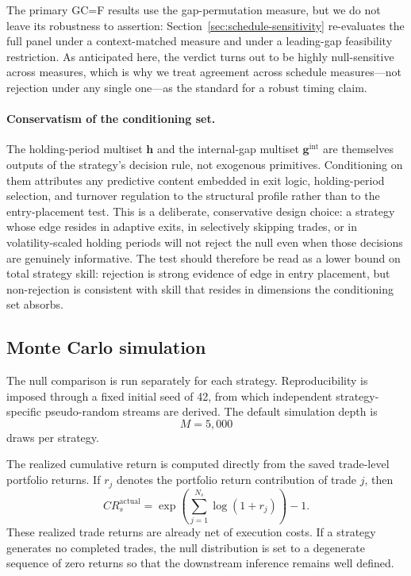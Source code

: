 \documentclass[preprint,12pt]{elsarticle}
\theoremstyle{definition}
\begin{document}
The primary GC=F results use the gap-permutation measure, but we do not leave its robustness to assertion: Section~\ref{sec:schedule-sensitivity} re-evaluates the full panel under a context-matched measure and under a leading-gap feasibility restriction. As anticipated here, the verdict turns out to be highly null-sensitive across measures, which is why we treat agreement across schedule measures---not rejection under any single one---as the standard for a robust timing claim.

\paragraph{Conservatism of the conditioning set.} The holding-period multiset $\mathbf{h}$ and the internal-gap multiset $\mathbf{g}^{\mathrm{int}}$ are themselves outputs of the strategy's decision rule, not exogenous primitives. Conditioning on them attributes any predictive content embedded in exit logic, holding-period selection, and turnover regulation to the structural profile rather than to the entry-placement test. This is a deliberate, conservative design choice: a strategy whose edge resides in adaptive exits, in selectively skipping trades, or in volatility-scaled holding periods will not reject the null even when those decisions are genuinely informative. The test should therefore be read as a lower bound on total strategy skill: rejection is strong evidence of edge in entry placement, but non-rejection is consistent with skill that resides in dimensions the conditioning set absorbs.

\subsection{Monte Carlo simulation}

The null comparison is run separately for each strategy. Reproducibility is imposed through a fixed initial seed of 42, from which independent strategy-specific pseudo-random streams are derived. The default simulation depth is
\begin{equation}
M=5{,}000
\end{equation}
draws per strategy.

The realized cumulative return is computed directly from the saved trade-level portfolio returns. If \(r_j\) denotes the portfolio return contribution of trade \(j\), then
\begin{equation}
CR_s^{\mathrm{actual}}
=
\exp\left(\sum_{j=1}^{N_s}\log(1+r_j)\right)-1.
\end{equation}
These realized trade returns are already net of execution costs. If a strategy generates no completed trades, the null distribution is set to a degenerate sequence of zero returns so that the downstream inference remains well defined.
\end{document}
